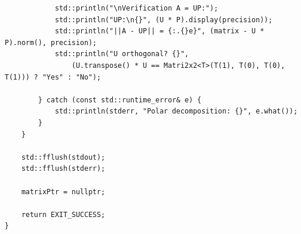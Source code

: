 \documentclass[11pt]{article}
\begin{document}
\begin{lstlisting}
            std::println("\nVerification A = UP:");
            std::println("UP:\n{}", (U * P).display(precision));
            std::println("||A - UP|| = {:.{}e}", (matrix - U * P).norm(), precision);
            std::println("U orthogonal? {}", 
                (U.transpose() * U == Matri2x2<T>(T(1), T(0), T(0), T(1))) ? "Yes" : "No");
            
        } catch (const std::runtime_error& e) {
            std::println(stderr, "Polar decomposition: {}", e.what());
        }
    }

    std::fflush(stdout);
    std::fflush(stderr);

    matrixPtr = nullptr;

    return EXIT_SUCCESS;
}
\end{lstlisting}
\end{document}
